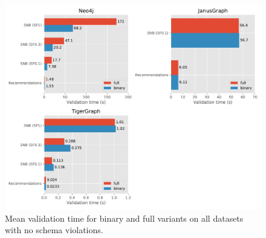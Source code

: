 \documentclass{report}
\theoremstyle{definition}
\begin{document}
\begin{figure}[p]
  \centering
  \includegraphics[scale=0.5]{figures/results-variant.pdf}
  \caption[Mean validation time for full and binary variants]{Mean validation time for binary and full variants on all datasets with no schema violations.}
  \label{fig:results-variant}
\end{figure}
\end{document}
